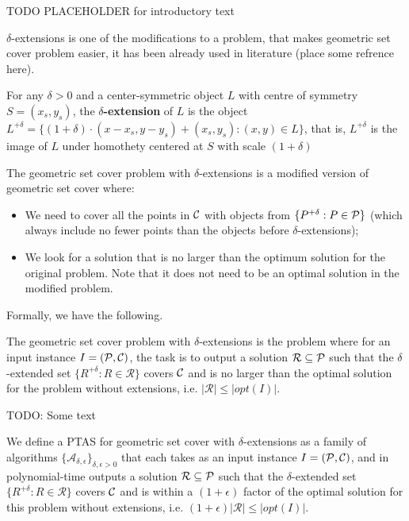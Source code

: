 TODO PLACEHOLDER for introductory text

$\delta$-extensions is one of the
modifications to a problem, that makes geometric set cover problem easier,
it has been already used in literature (place some refrence here).

\begin{defi}
For any $\delta > 0$ and a center-symmetric object $L$ with
centre of symmetry $S = (x_s, y_s)$,
the \textbf{$\delta$-extension} of $L$ is the object $L^{+\delta} =
\{(1 + \delta)\cdot(x - x_s, y - y_s) + (x_s, y_s) : (x, y) \in L\}$,
that is, $L^{+\delta}$ is the image of $L$ under homothety centered
at $S$ with scale $(1+\delta)$
\end{defi}


The geometric set cover problem with $\delta$-extensions
is a modified version of geometric set cover where:
\begin{itemize}
\item We need to cover all the points in $\mathcal{C}$
with objects from $\{P^{+\delta} : P \in \mathcal{P}\}$ (which always 
include no fewer points than the objects
before $\delta$-extensions);
\item We look for a solution that is no larger than the optimum solution
for the original problem.
Note that it does not need to be an optimal solution in
the modified problem.
\end{itemize}

Formally, we have the following.

\begin{defi}
The geometric set cover problem
with $\delta$-extensions is the problem where for an input instance
$I=(\mathcal{P}, \mathcal{C})$,
the task is to output a solution $\mathcal{R} \subseteq \mathcal{P}$
such that the $\delta$-extended set
$\{ R^{+\delta} :  R \in \mathcal{R} \}$ covers $\mathcal{C}$
and is no larger than the optimal solution for the problem without
extensions, i.e. $|\mathcal{R}| \le |opt(I)|$.
\end{defi}

TODO: Some text

\begin{defi}
We define a PTAS for geometric set cover 
with $\delta$-extensions as a family of algorithms
$\{\mathcal{A}_{\delta, \epsilon}\}_{\delta, \epsilon > 0}$ that
each takes as an input instance $I=(\mathcal{P}, \mathcal{C})$,
and in polynomial-time outputs a solution $\mathcal{R} \subseteq \mathcal{P}$
such that the $\delta$-extended set
$\{ R^{+\delta} :  R \in \mathcal{R} \}$ covers $\mathcal{C}$
and is within a $(1+\epsilon)$ factor of the optimal
solution for this problem without
extensions, i.e. $(1+\epsilon)|\mathcal{R}| \le |opt(I)|$.

\end{defi}
